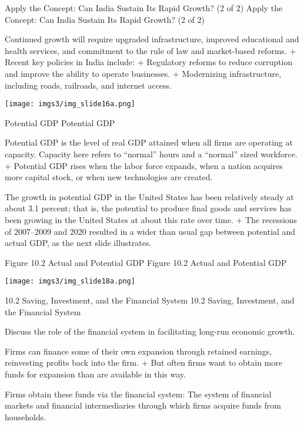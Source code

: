 \documentclass[
  12pt,
  ignorenonframetext,
]{beamer}
\begin{document}
\begin{frame}{Apply the Concept: Can India Sustain Its Rapid Growth? (2
of 2)}
\protect\hypertarget{apply-the-concept-can-india-sustain-its-rapid-growth-2-of-2}{}
Apply the Concept: Can India Sustain Its Rapid Growth? (2 of 2)

Continued growth will require upgraded infrastructure, improved
educational and health services, and commitment to the rule of law and
market-based reforms. + Recent key policies in India include: +
Regulatory reforms to reduce corruption and improve the ability to
operate businesses. + Modernizing infrastructure, including roads,
railroads, and internet access.

\texttt{[image: imgs3/img\_slide16a.png]}
\end{frame}

\begin{frame}{Potential GDP}
\protect\hypertarget{potential-gdp}{}
Potential GDP

Potential GDP is the level of real GDP attained when all firms are
operating at capacity. Capacity here refers to ``normal'' hours and a
``normal'' sized workforce. + Potential GDP rises when the labor force
expands, when a nation acquires more capital stock, or when new
technologies are created.

The growth in potential GDP in the United States has been relatively
steady at about 3.1 percent; that is, the potential to produce final
goods and services has been growing in the United States at about this
rate over time. + The recessions of 2007--2009 and 2020 resulted in a
wider than usual gap between potential and actual GDP, as the next slide
illustrates.
\end{frame}

\begin{frame}{Figure 10.2 Actual and Potential GDP}
\protect\hypertarget{figure-10.2-actual-and-potential-gdp}{}
Figure 10.2 Actual and Potential GDP

\texttt{[image: imgs3/img\_slide18a.png]}
\end{frame}

\begin{frame}{10.2 Saving, Investment, and the Financial System}
\protect\hypertarget{saving-investment-and-the-financial-system}{}
10.2 Saving, Investment, and the Financial System

Discuss the role of the financial system in facilitating long-run
economic growth.

Firms can finance some of their own expansion through retained earnings,
reinvesting profits back into the firm. + But often firms want to obtain
more funds for expansion than are available in this way.

Firms obtain these funds via the financial system: The system of
financial markets and financial intermediaries through which firms
acquire funds from households.
\end{frame}
\end{document}
